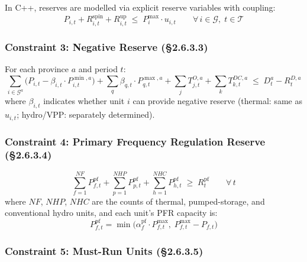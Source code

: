 In C++, reserves are modelled via explicit reserve variables with coupling:
\begin{equation}\label{eq:reserve-coupling}
  P_{i,t} + R^{\mathrm{spin}}_{i,t} + R^{\mathrm{up}}_{i,t}
  \;\leq\; P^{\max}_i \cdot u_{i,t}
  \qquad \forall\, i \in \mathcal{G},\; t \in \mathcal{T}
\end{equation}

\subsubsection{Constraint 3: Negative Reserve (§2.6.3.3)}\label{sec:scuc-neg-reserve}

For each province $a$ and period $t$:
\begin{equation}\label{eq:neg-reserve}
  \sum_{i \in \mathcal{G}^a}
    \bigl(P_{i,t} - \beta_{i,t} \cdot P^{\min,a}_{i,t}\bigr)
  + \sum_{q} \beta_{q,t} \cdot P^{\max,a}_{q,t}
  + \sum_{j} T^{O,a}_{j,t}
  + \sum_{k} T^{DC,a}_{k,t}
  \;\leq\;
  D^{a}_{t} - R^{D,a}_{t}
\end{equation}
where $\beta_{i,t}$ indicates whether unit $i$ can provide negative reserve
(thermal: same as $u_{i,t}$; hydro/VPP: separately determined).

\subsubsection{Constraint 4: Primary Frequency Regulation Reserve (§2.6.3.4)}\label{sec:scuc-pf-reserve}

\begin{equation}\label{eq:pf-reserve}
  \sum_{f=1}^{NF} P^{\mathrm{pf}}_{f,t}
  + \sum_{p=1}^{NHP} P^{\mathrm{pf}}_{p,t}
  + \sum_{h=1}^{NHC} P^{\mathrm{pf}}_{h,t}
  \;\geq\; R^{\mathrm{pf}}_t
  \qquad \forall\, t
\end{equation}
where $NF$, $NHP$, $NHC$ are the counts of thermal, pumped-storage,
and conventional hydro units, and each unit's PFR capacity is:
\begin{equation}
  P^{\mathrm{pf}}_{f,t} = \min\bigl(\alpha^{\mathrm{pf}}_f \cdot P^{\max}_{f,t},\;
  P^{\max}_{f,t} - P_{f,t}\bigr)
\end{equation}

\subsubsection{Constraint 5: Must-Run Units (§2.6.3.5)}\label{sec:scuc-mustrun}

